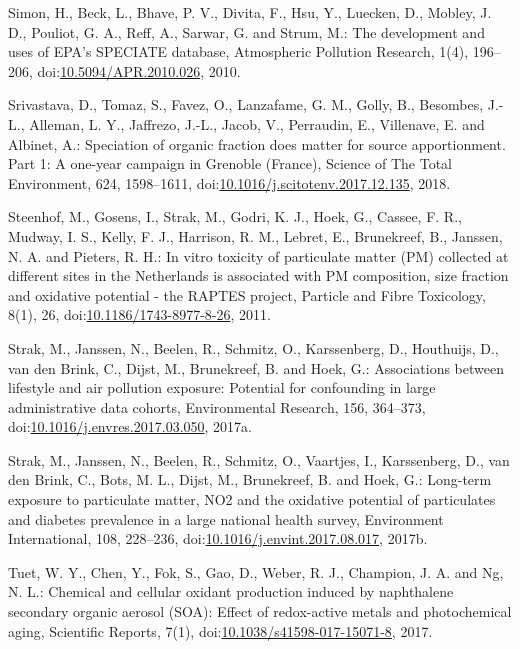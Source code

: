\documentclass[
]{article}
\begin{document}
Simon, H., Beck, L., Bhave, P. V., Divita, F., Hsu, Y., Luecken, D.,
Mobley, J. D., Pouliot, G. A., Reff, A., Sarwar, G. and Strum, M.: The
development and uses of EPA's SPECIATE database, Atmospheric Pollution
Research, 1(4), 196--206,
doi:\href{https://doi.org/10.5094/APR.2010.026}{10.5094/APR.2010.026},
2010.

Srivastava, D., Tomaz, S., Favez, O., Lanzafame, G. M., Golly, B.,
Besombes, J.-L., Alleman, L. Y., Jaffrezo, J.-L., Jacob, V., Perraudin,
E., Villenave, E. and Albinet, A.: Speciation of organic fraction does
matter for source apportionment. Part 1: A one-year campaign in Grenoble
(France), Science of The Total Environment, 624, 1598--1611,
doi:\href{https://doi.org/10.1016/j.scitotenv.2017.12.135}{10.1016/j.scitotenv.2017.12.135},
2018.

Steenhof, M., Gosens, I., Strak, M., Godri, K. J., Hoek, G., Cassee, F.
R., Mudway, I. S., Kelly, F. J., Harrison, R. M., Lebret, E.,
Brunekreef, B., Janssen, N. A. and Pieters, R. H.: In vitro toxicity of
particulate matter (PM) collected at different sites in the Netherlands
is associated with PM composition, size fraction and oxidative potential
- the RAPTES project, Particle and Fibre Toxicology, 8(1), 26,
doi:\href{https://doi.org/10.1186/1743-8977-8-26}{10.1186/1743-8977-8-26},
2011.

Strak, M., Janssen, N., Beelen, R., Schmitz, O., Karssenberg, D.,
Houthuijs, D., van den Brink, C., Dijst, M., Brunekreef, B. and Hoek,
G.: Associations between lifestyle and air pollution exposure: Potential
for confounding in large administrative data cohorts, Environmental
Research, 156, 364--373,
doi:\href{https://doi.org/10.1016/j.envres.2017.03.050}{10.1016/j.envres.2017.03.050},
2017a.

Strak, M., Janssen, N., Beelen, R., Schmitz, O., Vaartjes, I.,
Karssenberg, D., van den Brink, C., Bots, M. L., Dijst, M., Brunekreef,
B. and Hoek, G.: Long-term exposure to particulate matter, NO2 and the
oxidative potential of particulates and diabetes prevalence in a large
national health survey, Environment International, 108, 228--236,
doi:\href{https://doi.org/10.1016/j.envint.2017.08.017}{10.1016/j.envint.2017.08.017},
2017b.

Tuet, W. Y., Chen, Y., Fok, S., Gao, D., Weber, R. J., Champion, J. A.
and Ng, N. L.: Chemical and cellular oxidant production induced by
naphthalene secondary organic aerosol (SOA): Effect of redox-active
metals and photochemical aging, Scientific Reports, 7(1),
doi:\href{https://doi.org/10.1038/s41598-017-15071-8}{10.1038/s41598-017-15071-8},
2017.
\end{document}
